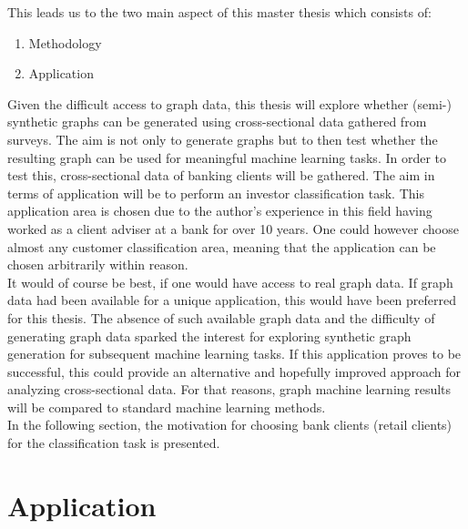 	\noindent This leads us to the two main aspect of this master thesis which
	consists of:
	
	\begin{enumerate}
		\item Methodology
		\item Application
	\end{enumerate} 

	\noindent Given the difficult access to graph data, this thesis will
	explore whether (semi-) synthetic graphs can be generated using
	cross-sectional data gathered from surveys. The aim is not only to generate
	graphs but to then test whether the resulting graph can be used for
	meaningful machine learning tasks. In order to test this, cross-sectional 
	data of banking clients will be gathered. The aim in terms of application 
	will be to perform an investor classification task. This application area is
	chosen due to the author's experience in this field having worked as a
	client adviser at a bank for over 10 years. One could however choose almost
	any customer classification area, meaning that the application can be chosen
	arbitrarily within reason. \\

	\noindent It would of course be best, if one would have access to real
	graph data. If graph data had been available for a unique application, this
	would have been preferred for this thesis. The absence of such available 
	graph data and the difficulty of generating graph data sparked the interest
	for exploring synthetic graph generation for subsequent machine learning
	tasks. If this application proves to be successful, this could provide an 
	alternative and hopefully improved approach for analyzing cross-sectional 
	data. For that reasons, graph machine learning results will be compared to
	standard machine learning methods.\\

	\noindent In the following section, the motivation for choosing bank
	clients (retail clients) for the classification task is presented. 


	\section{Application}

